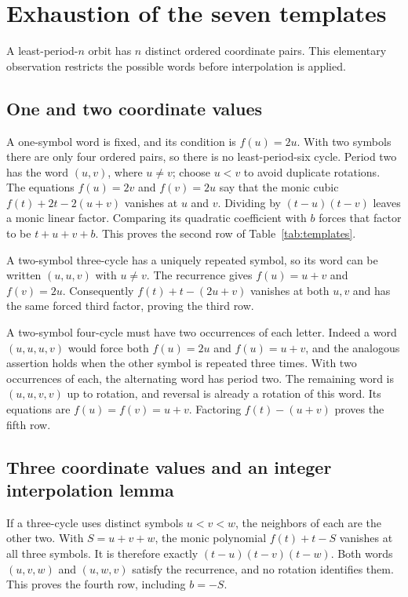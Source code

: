 \section{Exhaustion of the seven templates}
\label{sec:templates}

A least-period-$n$ orbit has $n$ distinct ordered coordinate pairs.
This elementary observation restricts the possible words before
interpolation is applied.

\subsection{One and two coordinate values}

A one-symbol word is fixed, and its condition is $f(u)=2u$.
With two symbols there are only four ordered pairs, so there is
no least-period-six cycle. Period two has the word $(u,v)$,
where $u\ne v$; choose $u<v$ to avoid duplicate rotations.
The equations $f(u)=2v$ and $f(v)=2u$ say that the monic cubic
$f(t)+2t-2(u+v)$ vanishes at $u$ and $v$. Dividing by
$(t-u)(t-v)$ leaves a monic linear factor. Comparing its quadratic
coefficient with $b$ forces that factor to be $t+u+v+b$.
This proves the second row of Table~\ref{tab:templates}.

A two-symbol three-cycle has a uniquely repeated symbol, so its
word can be written $(u,u,v)$ with $u\ne v$.
The recurrence gives $f(u)=u+v$ and $f(v)=2u$.
Consequently $f(t)+t-(2u+v)$ vanishes at both $u,v$ and has the
same forced third factor, proving the third row.

A two-symbol four-cycle must have two occurrences of each letter.
Indeed a word $(u,u,u,v)$ would force both $f(u)=2u$ and
$f(u)=u+v$, and the analogous assertion holds when the other
symbol is repeated three times. With two occurrences of each,
the alternating word has period two. The remaining word is
$(u,u,v,v)$ up to rotation, and reversal is already a rotation
of this word. Its equations are $f(u)=f(v)=u+v$. Factoring
$f(t)-(u+v)$ proves the fifth row.

\subsection{Three coordinate values and an integer interpolation lemma}

If a three-cycle uses distinct symbols $u<v<w$, the neighbors of
each are the other two. With $S=u+v+w$, the monic polynomial
$f(t)+t-S$ vanishes at all three symbols. It is therefore exactly
$(t-u)(t-v)(t-w)$. Both words $(u,v,w)$ and $(u,w,v)$ satisfy
the recurrence, and no rotation identifies them. This proves
the fourth row, including $b=-S$.

